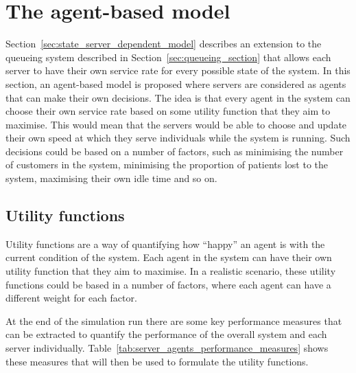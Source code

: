 \section{The agent-based model}\label{sec:agent_based_model}

Section~\ref{sec:state_server_dependent_model} describes an extension to the
queueing system described in Section~\ref{sec:queueing_section} that allows
each server to have their own service rate for every possible state of the
system.
In this section, an agent-based model is proposed where servers are considered
as agents that can make their own decisions.
The idea is that every agent in the system can choose their own service rate
based on some utility function that they aim to maximise.
This would mean that the servers would be able to choose and update their own
speed at which they serve individuals while the system is running.
Such decisions could be based on a number of factors, such as minimising the
number of customers in the system, minimising the proportion of patients lost
to the system, maximising their own idle time and so on.

\subsection{Utility functions}

Utility functions are a way of quantifying how ``happy'' an agent is with the
current condition of the system.
Each agent in the system can have their own utility function that they aim to
maximise.
In a realistic scenario, these utility functions could be based in a number of
factors, where each agent can have a different weight for each factor.

At the end of the simulation run there are some key performance measures that
can be extracted to quantify the performance of the overall system and each
server individually.
Table~\ref{tab:server_agents_performance_measures} shows these measures that
will then be used to formulate the utility functions.

